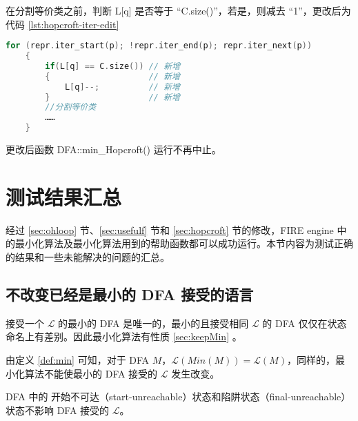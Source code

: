 在分割等价类之前，判断 L[q] 是否等于 “C.size()”，若是，则减去 “1”，更改后为代码 \ref{lst:hopcroft-iter-edit}

\lstset{style=mystyle}
\begin{lstlisting}[language=C++,label={lst:hopcroft-iter-edit},caption={ min-hop.cpp },firstnumber=100]
    for (repr.iter_start(p); !repr.iter_end(p); repr.iter_next(p))
    {
        if(L[q] == C.size()) // 新增
        {                    // 新增
            L[q]--;          // 新增
        }                    // 新增
        //分割等价类
        ……
    }
\end{lstlisting}

更改后函数 DFA::min\_Hopcroft() 运行不再中止。

\section{测试结果汇总}

经过 \ref{sec:ohloop} 节、\ref{sec:usefulf} 节和 \ref{sec:hopcroft} 节的修改，FIRE engine 中的最小化算法及最小化算法用到的帮助函数都可以成功运行。本节内容为测试正确的结果和一些未能解决的问题的汇总。

\subsection{不改变已经是最小的 DFA 接受的语言}

接受一个 $\mathcal{L}$ 的最小的 DFA 是唯一的，最小的且接受相同 $\mathcal{L}$ 的 DFA 仅仅在状态命名上有差别\cite{book1}。因此最小化算法有性质 \ref{sec:keepMin} 。

\begin{property}\label{sec:keepMin}
    由定义 \ref{def:min} 可知，对于 DFA $M$，$\mathcal{L}(Min(M))= \mathcal{L}(M)$，同样的，最小化算法不能使最小的 DFA 接受的 $\mathcal{L}$ 发生改变。
\end{property}

\begin{remark}
    DFA 中的 开始不可达（start-unreachable）状态和陷阱状态（final-unreachable）状态不影响 DFA 接受的 $\mathcal{L}$。
\end{remark}



